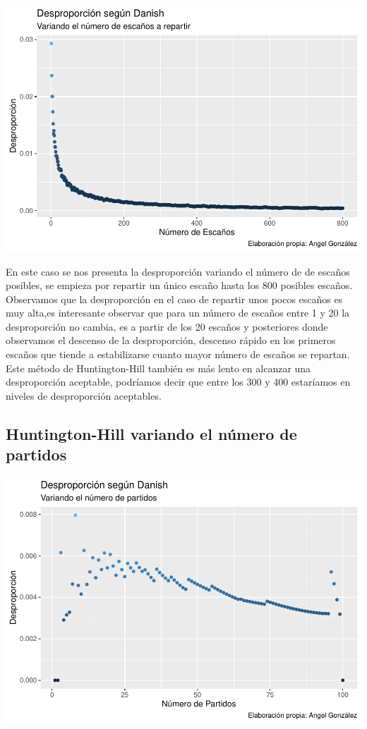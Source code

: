 \documentclass[12pt,a4paper,]{book}
\numberwithin{dummy}{section}
\theoremstyle{ocrenumbox}
\theoremstyle{blacknumex}
\theoremstyle{blacknumbox}
\theoremstyle{ocrenum}
\theoremstyle{ocrenum}
\begin{document}
\begin{center}\includegraphics[width=0.95\linewidth]{figurasR/unnamed-chunk-36-1} \end{center}

En este caso se nos presenta la desproporción variando el número de de
escaños posibles, se empieza por repartir un único escaño hasta los 800
posibles escaños. Observamos que la desproporción en el caso de repartir
unos pocos escaños es muy alta,es interesante observar que para un
número de escaños entre 1 y 20 la desproporción no cambia, es a partir
de los 20 escaños y posteriores donde observamos el descenso de la
desproporción, descenso rápido en los primeros escaños que tiende a
estabilizarse cuanto mayor número de escaños se repartan. Este método de
Huntington-Hill también es más lento en alcanzar una desproporción
aceptable, podríamos decir que entre los 300 y 400 estaríamos en niveles
de desproporción aceptables.

\hypertarget{huntington-hill-variando-el-nuxfamero-de-partidos}{%
\subsection{Huntington-Hill variando el número de
partidos}\label{huntington-hill-variando-el-nuxfamero-de-partidos}}

\begin{center}\includegraphics[width=0.95\linewidth]{figurasR/unnamed-chunk-37-1} \end{center}
\end{document}
